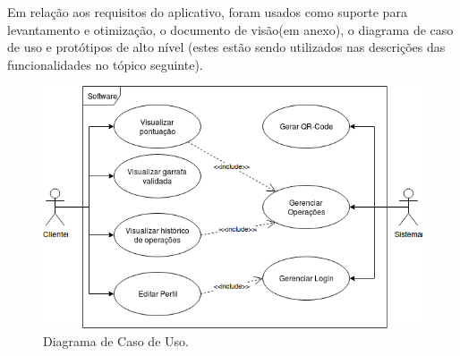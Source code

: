Em relação aos requisitos do aplicativo, foram usados como suporte para levantamento e otimização, o documento de visão(em anexo), o diagrama de caso de uso e protótipos de alto nível (estes estão sendo utilizados nas descrições das funcionalidades no tópico seguinte).

\begin{figure}[!ht]
	\centering
		\includegraphics[scale=0.4]{figuras/software/2-Diagrama-de-Caso-de-Uso.png}
	\caption{Diagrama de Caso de Uso.}
\end{figure}

